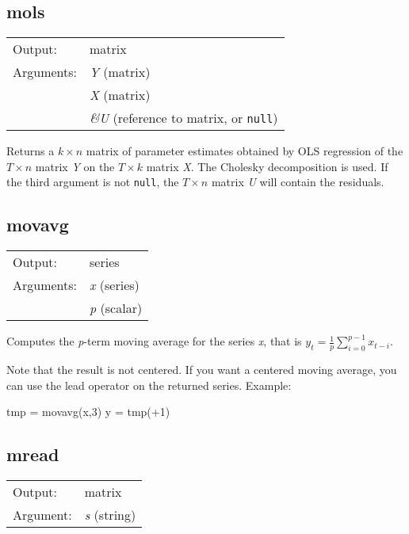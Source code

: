\subsection{mols}
\hypertarget{func-mols}{}

\begin{tabular}{ll}
Output:     & matrix\\
Arguments:  & \textsl{Y} (matrix)\\
           & \textsl{X} (matrix)\\
           & \textsl{\&U} (reference to matrix, or \texttt{null})\\
\end{tabular}

	  Returns a \ensuremath{k\times n} matrix of parameter estimates obtained
	  by OLS regression of the \ensuremath{T\times n} matrix
	  \textsl{Y} on the \ensuremath{T\times k} matrix
	  \textsl{X}. The Cholesky decomposition is used. If the
	  third argument is not \texttt{null}, the \ensuremath{T\times n} matrix
	  \textsl{U} will contain the residuals.

\subsection{movavg}
\hypertarget{func-movavg}{}

\begin{tabular}{ll}
Output:     & series\\
Arguments:  & \textsl{x} (series)\\
           & \textsl{p} (scalar)\\
\end{tabular}

	  Computes the \textsl{p}-term moving average for
	  the series
	  \textsl{x}, that is $y_t = \frac{1}{p}
	  \sum_{i=0}^{p-1} x_{t-i}$.

	  Note that the result is not centered. If you want a centered
	  moving average, you can use the lead operator on the
	  returned series. Example:

\begin{code}
	    tmp = movavg(x,3)
	    y = tmp(+1)

\end{code}

\subsection{mread}
\hypertarget{func-mread}{}

\begin{tabular}{ll}
Output:     & matrix\\
Argument:   & \textsl{s} (string)\\
\end{tabular}

